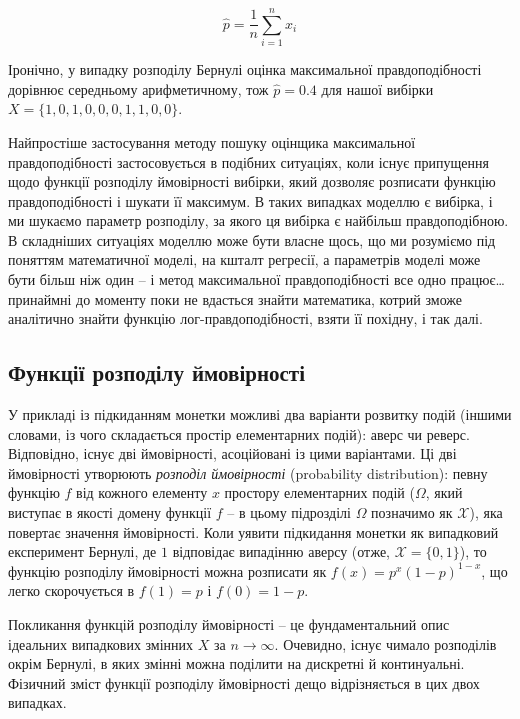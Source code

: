 \documentclass[
  11pt,
]{book}
\begin{document}
\[\hat{p} = \frac{1}{n} \sum \limits_{i=1}^n x_i\]

Іронічно, у випадку розподілу Бернулі оцінка максимальної
правдоподібності дорівнює середньому арифметичному, тож
\(\hat{p} = 0.4\) для нашої вибірки
\(X = \{1, 0, 1, 0, 0, 0, 1, 1, 0, 0\}\).

Найпростіше застосування методу пошуку оцінщика максимальної
правдоподібності застосовується в подібних ситуаціях, коли існує
припущення щодо функції розподілу ймовірності вибірки, який дозволяє
розписати функцію правдоподібності і шукати її максимум. В таких
випадках моделлю є вибірка, і ми шукаємо параметр розподілу, за якого ця
вибірка є найбільш правдоподібною. В складніших ситуаціях моделлю може
бути власне щось, що ми розуміємо під поняттям математичної моделі, на
кшталт регресії, а параметрів моделі може бути більш ніж один -- і метод
максимальної правдоподібності все одно працює\ldots{} принаймні до
моменту поки не вдасться знайти математика, котрий зможе аналітично
знайти функцію лог-правдоподібності, взяти її похідну, і так далі.

\subsection{Функції розподілу ймовірності}\label{pdfs}

У прикладі із підкиданням монетки можливі два варіанти розвитку подій
(іншими словами, із чого складається простір елементарних подій): аверс
чи реверс. Відповідно, існує дві ймовірності, асоційовані із цими
варіантами. Ці дві ймовірності утворюють \emph{розподіл ймовірності}
(probability distribution): певну функцію \(f\) від кожного елементу
\(x\) простору елементарних подій (\(\Omega\), який виступає в якості
домену функції \(f\) -- в цьому підрозділі \(\Omega\) позначимо як
\(\mathcal{X}\)), яка повертає значення ймовірності. Коли уявити
підкидання монетки як випадковий експеримент Бернулі, де \(1\)
відповідає випадінню аверсу (отже, \(\mathcal{X} = \{0, 1\}\)), то
функцію розподілу ймовірності можна розписати як
\(f(x) = p^x (1-p)^{1-x}\), що легко скорочується в \(f(1) = p\) і
\(f(0) = 1 - p\).

Покликання функцій розподілу ймовірності -- це фундаментальний опис
ідеальних випадкових змінних \(X\) за \(n \rightarrow \infty\).
Очевидно, існує чимало розподілів окрім Бернулі, в яких змінні можна
поділити на дискретні й континуальні. Фізичний зміст функції розподілу
ймовірності дещо відрізняється в цих двох випадках.
\end{document}
